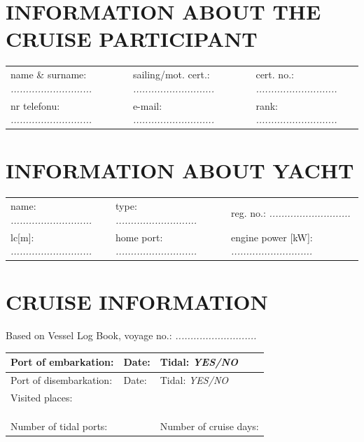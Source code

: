 \documentclass{article}
\begin{document}
\section*{INFORMATION ABOUT THE CRUISE PARTICIPANT}
\begin{tabularx}{\textwidth}{X X X}
name \& surname: \textit{...........................} & sailing/mot. cert.: \textit{...........................} & cert. no.: \textit{...........................} \\
nr telefonu: \textit{...........................} & e-mail: \textit{...........................} & rank: \textit{...........................} \\
\end{tabularx}

\section*{INFORMATION ABOUT YACHT}

\begin{tabularx}{\textwidth}{X X X}
name: \textit{...........................} & type: \textit{...........................} & reg. no.: \textit{...........................} \\
lc[m]: \textit{...........................} & home port: \textit{...........................} & engine power [kW]: \textit{...........................} \\
\end{tabularx}

\section*{CRUISE INFORMATION}

Based on Vessel Log Book, voyage no.: \textit{...........................}
\\

\begin{tabularx}{\textwidth}{|X|X|X|}
\hline
Port of embarkation: \textit{} & Date: \textit{} & Tidal: \textit{YES/NO} \\
\hline
Port of disembarkation: \textit{} & Date: \textit{} & Tidal: \textit{YES/NO} \\
\hline
\multicolumn{3}{|l|}{Visited places:
\dotfill} \\
\multicolumn{3}{|l|}{\dotfill} \\
\multicolumn{3}{|l|}{\dotfill} \\
\multicolumn{3}{|l|}{\dotfill} \\

\hline
\multicolumn{2}{|l|}{Number of tidal ports: \textit{}} & Number of cruise days: \textit{}\\
\hline
\end{tabularx}
\\\\
\end{document}
